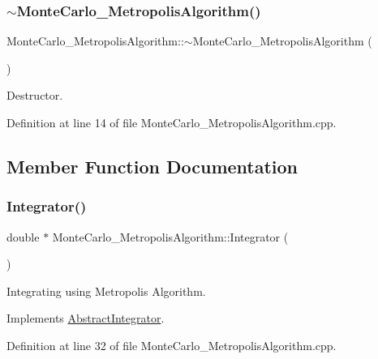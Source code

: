 \subsubsection{\texorpdfstring{$\sim$\+Monte\+Carlo\+\_\+\+Metropolis\+Algorithm()}{~MonteCarlo\_MetropolisAlgorithm()}}
{\footnotesize\ttfamily Monte\+Carlo\+\_\+\+Metropolis\+Algorithm\+::$\sim$\+Monte\+Carlo\+\_\+\+Metropolis\+Algorithm (\begin{DoxyParamCaption}{ }\end{DoxyParamCaption})}



Destructor. 



Definition at line 14 of file Monte\+Carlo\+\_\+\+Metropolis\+Algorithm.\+cpp.



\subsection{Member Function Documentation}
\mbox{\label{class_monte_carlo___metropolis_algorithm_a93fba72a50330bf184156e23158992b2}} 
\subsubsection{\texorpdfstring{Integrator()}{Integrator()}}
{\footnotesize\ttfamily double $\ast$ Monte\+Carlo\+\_\+\+Metropolis\+Algorithm\+::\+Integrator (\begin{DoxyParamCaption}{ }\end{DoxyParamCaption})\hspace{0.3cm}{\ttfamily [virtual]}}



Integrating using Metropolis Algorithm. 



Implements \hyperlink{class_abstract_integrator_a073d8f87239f732b3d2832070caa3b17}{Abstract\+Integrator}.



Definition at line 32 of file Monte\+Carlo\+\_\+\+Metropolis\+Algorithm.\+cpp.

\mbox{\label{class_monte_carlo___metropolis_algorithm_adcbfbdb6058a0a6de2f8b18698834a91}} 
